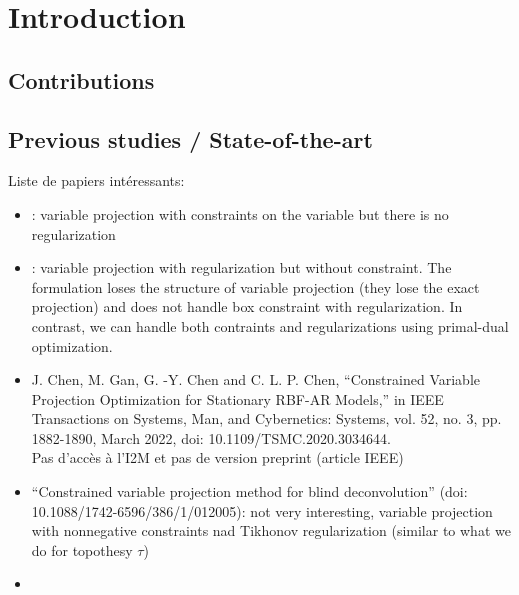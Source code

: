 \section{Introduction}


\subsection{Contributions}


\subsection{Previous studies / State-of-the-art}
\label{ssec:prev_stud}


Liste de papiers intéressants:
\begin{itemize}
\item \cite{OLeary_D_2012_j-comput-optim-appl_variable_pnlsp}: variable projection
  with constraints on the variable but there is no regularization
\item \cite{Leeuwen_T_2021_j-siam-j-sci-comput_variable_pnp}: variable projection
  with regularization but without constraint.
  The formulation loses the structure of variable projection (they lose the exact
  projection) and does not handle box constraint with regularization.
  In contrast, we can handle both contraints and regularizations using
  primal-dual optimization.
\item J. Chen, M. Gan, G. -Y. Chen and C. L. P. Chen, ``Constrained Variable Projection Optimization for Stationary RBF-AR Models,'' in IEEE Transactions on Systems, Man, and Cybernetics: Systems, vol. 52, no. 3, pp. 1882-1890, March 2022, doi: 10.1109/TSMC.2020.3034644. \\
  Pas d'accès à l'I2M et pas de version preprint (article IEEE)
\item ``Constrained variable projection method for blind deconvolution''
  (doi: 10.1088/1742-6596/386/1/012005): not very interesting, variable
  projection with nonnegative constraints nad Tikhonov regularization
  (similar to what we do for topothesy $\tau$)
\item {}
\end{itemize}


